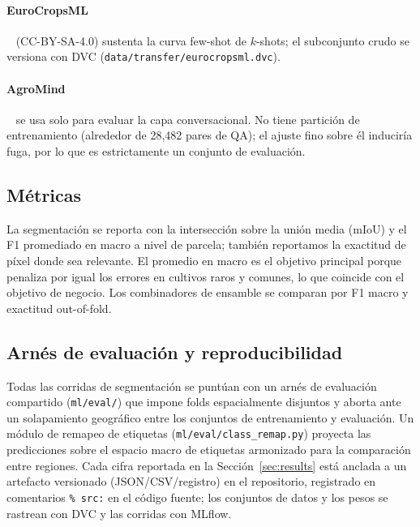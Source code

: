 \paragraph{EuroCropsML}~\cite{reuss2025eurocropsml} (CC-BY-SA-4.0)
sustenta la curva few-shot de $k$-shots; el subconjunto crudo se versiona
con DVC (\texttt{data/transfer/eurocropsml.dvc}).

\paragraph{AgroMind}~\cite{ruan2025agromind} se usa solo para evaluar la
capa conversacional. No tiene partición de entrenamiento (alrededor de
28{,}482 pares de QA); el ajuste fino sobre él induciría fuga, por lo que
es estrictamente un conjunto de evaluación.

\subsection{Métricas}
La segmentación se reporta con la intersección sobre la unión media
(mIoU) y el F1 promediado en macro a nivel de parcela; también
reportamos la exactitud de píxel donde sea relevante. El promedio en
macro es el objetivo principal porque penaliza por igual los errores en
cultivos raros y comunes, lo que coincide con el objetivo de negocio.
Los combinadores de ensamble se comparan por F1 macro y exactitud
out-of-fold.

\subsection{Arnés de evaluación y reproducibilidad}
Todas las corridas de segmentación se puntúan con un arnés de evaluación
compartido (\texttt{ml/eval/}) que impone folds espacialmente disjuntos
y aborta ante un solapamiento geográfico entre los conjuntos de
entrenamiento y evaluación. Un módulo de remapeo de etiquetas
(\texttt{ml/eval/class\_remap.py}) proyecta las predicciones sobre el
espacio macro de etiquetas armonizado para la comparación entre
regiones. Cada cifra reportada en la Sección~\ref{sec:results} está
anclada a un artefacto versionado (JSON/CSV/registro) en el repositorio,
registrado en comentarios \texttt{\% src:} en el código fuente; los
conjuntos de datos y los pesos se rastrean con DVC y las corridas con
MLflow.

